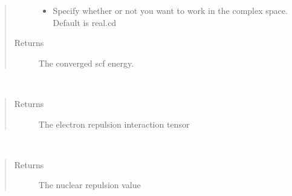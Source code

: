 \documentclass[letterpaper,10pt,english]{sphinxmanual}
\begin{document}
\begin{fulllineitems}
\begin{fulllineitems}
\begin{quote}
\begin{description}
\begin{itemize}
\item {} 
 \textendash{} Specify whether or not you want to work in the complex space. Default is real.cd

\end{itemize}

\item[{Returns}] \leavevmode
The converged scf energy.

\end{description}\end{quote}

\end{fulllineitems}


\begin{fulllineitems}
\label{\detokenize{GHF:hf.HartreeFock.GHF.MF.get_two_e}}~\begin{quote}\begin{description}
\item[{Returns}] \leavevmode
The electron repulsion interaction tensor

\end{description}\end{quote}

\end{fulllineitems}


\begin{fulllineitems}
\label{\detokenize{GHF:hf.HartreeFock.GHF.MF.nuc_rep}}~\begin{quote}\begin{description}
\item[{Returns}] \leavevmode
The nuclear repulsion value

\end{description}\end{quote}

\end{fulllineitems}



\end{fulllineitems}
\end{document}
